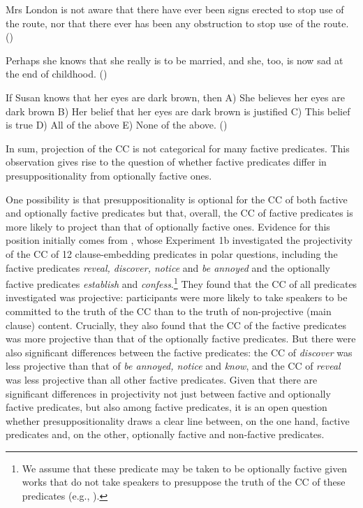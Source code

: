 \documentclass[11pt,fleqn]{article}
\newcommand{\6}{\mbox{$[\hspace*{-.6mm}[$}}
\newcommand{\9}{\mbox{$]\hspace*{-.6mm}]$}}
\begin{document}
\begin{exe}
\ex\label{nat2}

\begin{xlist}

\ex Mrs London is not aware that there have ever been signs erected to stop use of the route, nor that there ever has been  any obstruction to stop use of the route. \hfill (\citealt[83]{beaver-belly})

\ex Perhaps she knows that she really is to be married, and she, too, is now sad at the end of childhood. \hfill (\citealt[86]{beaver-belly})

\ex If Susan knows that her eyes are dark brown, then A) She believes her eyes are dark brown B) Her belief that her eyes are dark brown is justified C) This belief is true D) All of the above E) None of the above. \hfill (\citealt[84]{beaver-belly})

\end{xlist}
\end{exe}
In sum, projection of the CC is not categorical for many factive predicates. This observation gives rise to the question of whether factive predicates differ in presuppositionality from optionally factive ones.

One possibility is that presuppositionality is optional for the CC of both factive and optionally factive predicates but that, overall, the CC of factive predicates is more likely to project than that of optionally factive ones. Evidence for this position initially comes from \citealt*{tbd-variability}, whose Experiment 1b investigated the projectivity of the CC of 12 clause-embedding predicates in polar questions, including the factive predicates {\em reveal, discover, notice} and {\em be annoyed} and the optionally factive predicates {\em establish} and {\em confess}.\footnote{We assume that these predicate may be taken to be optionally factive given works that do not take speakers to presuppose the truth of the CC of these predicates (e.g., \citealt{wyse,swanson2012,karttunen2016}).} They found that the CC of all predicates investigated was projective: participants were more likely to take speakers to be committed to the truth of the CC than to the truth of non-projective (main clause) content. Crucially, they also found that the CC of the factive predicates was more projective than that of the optionally factive predicates. But there were also significant differences between the factive predicates: the CC of {\em discover} was less projective than that of {\em be annoyed, notice} and {\em know}, and the CC of {\em reveal} was less projective than all other factive predicates. Given that there are significant differences in projectivity not just between factive and optionally factive predicates, but also among factive predicates, it is an open question whether presuppositionality draws a clear line between, on the one hand, factive predicates and, on the other, optionally factive and non-factive predicates.
\end{document}

